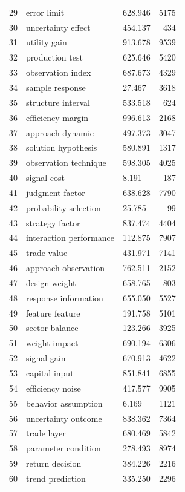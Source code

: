 \documentclass[11pt]{report}
\begin{document}
\begin{longtable}{rllr}
29 & error limit & 628.946 & 5175 \\
30 & uncertainty effect & 454.137 & 434 \\
31 & utility gain & 913.678 & 9539 \\
32 & production test & 625.646 & 5420 \\
33 & observation index & 687.673 & 4329 \\
34 & sample response & 27.467 & 3618 \\
35 & structure interval & 533.518 & 624 \\
36 & efficiency margin & 996.613 & 2168 \\
37 & approach dynamic & 497.373 & 3047 \\
38 & solution hypothesis & 580.891 & 1317 \\
39 & observation technique & 598.305 & 4025 \\
40 & signal cost & 8.191 & 187 \\
41 & judgment factor & 638.628 & 7790 \\
42 & probability selection & 25.785 & 99 \\
43 & strategy factor & 837.474 & 4404 \\
44 & interaction performance & 112.875 & 7907 \\
45 & trade value & 431.971 & 7141 \\
46 & approach observation & 762.511 & 2152 \\
47 & design weight & 658.765 & 803 \\
48 & response information & 655.050 & 5527 \\
49 & feature feature & 191.758 & 5101 \\
50 & sector balance & 123.266 & 3925 \\
51 & weight impact & 690.194 & 6306 \\
52 & signal gain & 670.913 & 4622 \\
53 & capital input & 851.841 & 6855 \\
54 & efficiency noise & 417.577 & 9905 \\
55 & behavior assumption & 6.169 & 1121 \\
56 & uncertainty outcome & 838.362 & 7364 \\
57 & trade layer & 680.469 & 5842 \\
58 & parameter condition & 278.493 & 8974 \\
59 & return decision & 384.226 & 2216 \\
60 & trend prediction & 335.250 & 2296 \\
\end{longtable}
\end{document}
